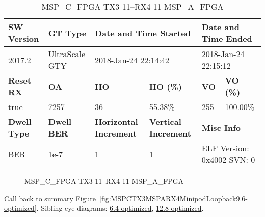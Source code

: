 \begin{table}[h]
\centering
\caption{MSP\_C\_FPGA-TX3-11--RX4-11-MSP\_A\_FPGA}
\label{tab:MSPCFPGATX311RX411MSPAFPGA9.6-optimized}
\begin{tabular}{@{}|l|l|l|l|l|l|@{}}
\toprule
\textbf{SW Version}                & \textbf{GT Type}   & \multicolumn{2}{l|}{\textbf{Date and Time Started}}            & \multicolumn{2}{l|}{\textbf{Date and Time Ended}}        \\ \midrule
2017.2                       & UltraScale GTY          & \multicolumn{2}{l|}{2018-Jan-24 22:14:42}                   & \multicolumn{2}{l|}{2018-Jan-24 22:15:12}               \\ \midrule
\textbf{Reset RX}                  & \textbf{OA} & \textbf{HO}   & \textbf{HO (\%)} & \textbf{VO} & \textbf{VO (\%)} \\ \midrule
true & 7257        & 36          & 55.38\%        & 255        & 100.00\%       \\ \midrule
\textbf{Dwell Type}                & \textbf{Dwell BER} & \textbf{Horizontal Increment} & \textbf{Vertical Increment}    & \multicolumn{2}{l|}{\textbf{Misc Info}}                  \\ \midrule
BER                            & 1e-7        & 1        & 1           & \multicolumn{2}{l|}{ELF Version: 0x4002 SVN: 0}                         \\ \bottomrule
\end{tabular}
\end{table}

\begin{figure}[h]
\caption{MSP\_C\_FPGA-TX3-11--RX4-11-MSP\_A\_FPGA} \label{fig:MSPCFPGATX311RX411MSPAFPGA9.6-optimized}
\end{figure}

Call back to summary Figure~\ref{fig:MSPCTX3MSPARX4MinipodLoopback9.6-optimized}.
Sibling eye diagrams: \hyperref[sec:MSPCFPGATX311RX411MSPAFPGA6.4-optimized]{6.4-optimized}, \hyperref[sec:MSPCFPGATX311RX411MSPAFPGA12.8-optimized]{12.8-optimized}.

\clearpage
\newpage

